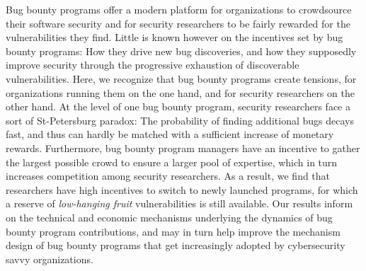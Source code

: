 Bug bounty programs offer a modern platform for organizations to crowdsource their software security and for security researchers to be fairly rewarded for the vulnerabilities they find. Little is known however on the incentives set by bug bounty programs: How they drive new bug discoveries, and how they supposedly improve security through the progressive exhaustion of discoverable vulnerabilities. Here, we recognize that bug bounty programs create tensions, for organizations running them on the one hand, and for security researchers on the other hand. At the level of one bug bounty program, security researchers face a sort of St-Petersburg paradox: The probability of finding additional bugs decays fast, and thus can hardly be matched with a sufficient increase of monetary rewards. Furthermore, bug bounty program managers have an incentive to gather the largest possible crowd to ensure a larger pool of expertise, which in turn increases competition among security researchers. As a result, we find that researchers have high incentives to switch to newly launched programs, for which a reserve of {\it low-hanging fruit} vulnerabilities is still available. Our results inform on the technical and economic mechanisms underlying the dynamics of bug bounty program contributions, and may in turn help improve the mechanism design of bug bounty programs that get increasingly adopted by cybersecurity savvy organizations.